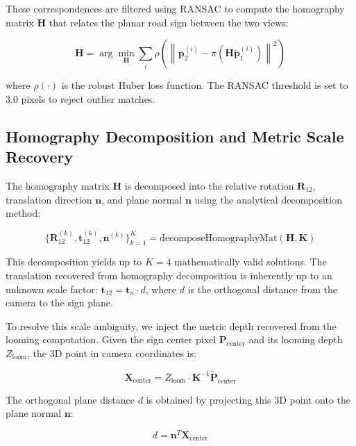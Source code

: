 \documentclass[runningheads]{llncs}
\begin{document}
These correspondences are filtered using RANSAC to compute the homography
matrix $\mathbf{H}$ that relates the planar road sign between the two views:

\begin{equation}
\mathbf{H} = \arg\min_{\mathbf{H}} \sum_{i} \rho\left(
\left\| \mathbf{p}_2^{(i)} - \pi\left(\mathbf{H} \tilde{\mathbf{p}}_1^{(i)}\right) \right\|^2
\right)
\end{equation}

where $\rho(\cdot)$ is the robust Huber loss function. The RANSAC threshold
is set to 3.0 pixels to reject outlier matches.

\subsection{Homography Decomposition and Metric Scale Recovery}

The homography matrix $\mathbf{H}$ is decomposed into the relative rotation
$\mathbf{R}_{12}$, translation direction $\mathbf{n}$, and plane normal
$\mathbf{n}$ using the analytical decomposition method:

\begin{equation}
\{\mathbf{R}_{12}^{(k)}, \mathbf{t}_{12}^{(k)}, \mathbf{n}^{(k)}\}_{k=1}^{K}
= \text{decomposeHomographyMat}(\mathbf{H}, \mathbf{K})
\label{eq:decomp}
\end{equation}

This decomposition yields up to $K = 4$ mathematically valid solutions. The
translation recovered from homography decomposition is inherently up to an
unknown scale factor: $\mathbf{t}_{12} = \mathbf{t}_n \cdot d$, where $d$ is
the orthogonal distance from the camera to the sign plane.

To resolve this scale ambiguity, we inject the metric depth recovered from the
looming computation. Given the sign center pixel $\mathbf{P}_{\text{center}}$ and
its looming depth $Z_{\text{loom}}$, the 3D point in camera coordinates is:

\begin{equation}
\mathbf{X}_{\text{center}} = Z_{\text{loom}} \cdot \mathbf{K}^{-1}
\tilde{\mathbf{P}}_{\text{center}}
\end{equation}

The orthogonal plane distance $d$ is obtained by projecting this 3D point onto
the plane normal $\mathbf{n}$:

\begin{equation}
d = \mathbf{n}^T \mathbf{X}_{\text{center}}
\label{eq:scale_injection}
\end{equation}
\end{document}
